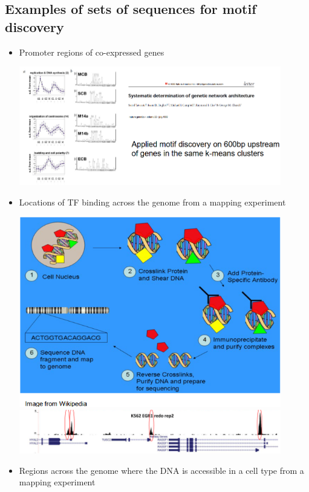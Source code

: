 \documentclass[10pt]{article}
\begin{document}
\subsection*{Examples of sets of sequences for motif discovery}
\begin{itemize}
	\item Promoter regions of co-expressed genes
	\begin{center} 
        \includegraphics*[width=0.9\textwidth]{W7_14.png} 
    \end{center}
    \item Locations of TF binding across the genome from a mapping experiment
    \begin{center}
        \includegraphics*[width=0.9\textwidth]{W7_15.png} \\
        \includegraphics*[width=0.9\textwidth]{W7_16.png} 
    \end{center}
    \item Regions across the genome where the DNA is accessible in a cell type from a mapping experiment

\end{itemize}
\end{document}
